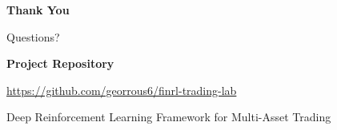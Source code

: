 \documentclass[10pt]{beamer}
\begin{document}
\begin{frame}[plain]

\begin{center}

\vspace{1cm}

{\Large \textbf{Thank You}}

\vspace{0.7cm}

{\large Questions?}

\vspace{1.2cm}

\textbf{Project Repository}

\vspace{0.2cm}

\url{https://github.com/georrous6/finrl-trading-lab}

\vfill

\small
Deep Reinforcement Learning Framework for Multi-Asset Trading

\end{center}

\end{frame}
\end{document}
